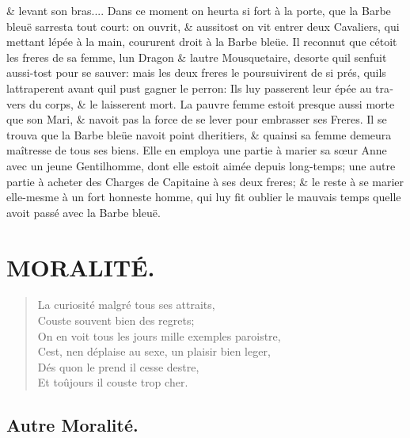 \documentclass[14pt,a4paper]{memoir}
\begin{document}
\begin{otherlanguage}{french}
\& levant son bras.... Dans ce moment on heurta si fort à la porte, que
la Barbe bleuë s\textquotesingle arresta tout court: on ouvrit, \&
aussitost on vit entrer deux Cavaliers, qui mettant
l\textquotesingle épée à la main, coururent droit à la Barbe bleüe. Il
reconnut que c\textquotesingle étoit les freres de sa femme,
l\textquotesingle un Dragon \& l\textquotesingle autre Mousquetaire,
desorte qu\textquotesingle il s\textquotesingle enfuit aussi-tost pour
se sauver: mais les deux freres le poursuivirent de si prés,
qu\textquotesingle ils l\textquotesingle attraperent avant
qu\textquotesingle il pust gagner le perron: Ils luy passerent leur épée
au travers du corps, \& le laisserent mort. La pauvre femme estoit
presque aussi morte que son Mari, \& n\textquotesingle avoit pas la
force de se lever pour embrasser ses Freres. Il se trouva que la Barbe
bleüe n\textquotesingle avoit point d\textquotesingle heritiers, \&
qu\textquotesingle ainsi sa femme demeura maîtresse de tous ses biens.
Elle en employa une partie à marier sa sœur Anne avec un jeune
Gentilhomme, dont elle estoit aimée depuis long-temps; une autre partie
à acheter des Charges de Capitaine à ses deux freres; \& le reste à se
marier elle-mesme à un fort honneste homme, qui luy fit oublier le
mauvais temps qu\textquotesingle elle avoit passé avec la Barbe bleuë. \\

\section{MORALITÉ.}

\begin{verse}
  \small
La curiosité malgré tous ses attraits, \\
Couste souvent bien des regrets; \\
On en voit tous les jours mille exemples paroistre, \\
C\textquotesingle est, n\textquotesingle en déplaise au sexe, un plaisir bien leger, \\
Dés qu\textquotesingle on le prend il cesse d\textquotesingle estre, \\
Et toûjours il couste trop cher.

\end{verse}

\subsection{Autre Moralité.}


\end{otherlanguage}
\end{document}
